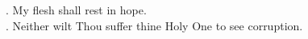 \begin{Parallel}[v]{\colw}{\colx}
{}
{\vern
{\noindent
\Vbar. My flesh shall rest in hope.\\
\Rbar. Neither wilt Thou suffer thine Holy One to see corruption.}}

\end{Parallel}


